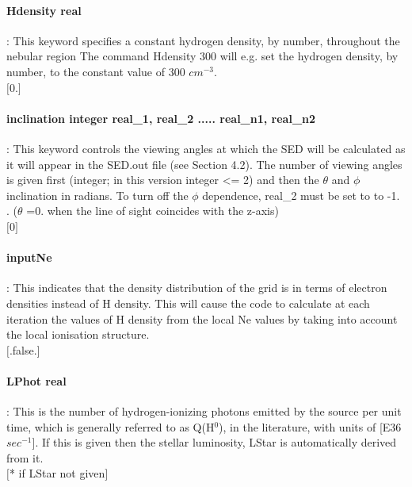 \documentclass[11pt]{article}
\begin{document}
\paragraph    {Hdensity real }   : This keyword specifies a constant hydrogen density, 
		     by number, throughout the nebular region 
		     The command Hdensity 300 will e.g. set the 
		     hydrogen density, by number, to the constant value of 300 $cm^{-3}$.\\
		     $[$0.$]$\\

\paragraph    {inclination integer real\_1, real\_2 ..... real\_{n1}, real\_{n2}} : This keyword controls the
                     viewing angles at which the SED will be calculated as it will appear 
		     in the SED.out file (see Section 4.2). The number of viewing 
		     angles is given first (integer; in this version integer <= 2) and then the $\theta$
                     and $\phi$ inclination in radians. To turn off the $\phi$ dependence, real\_2 must be set to 
		     to -1. . 
		     ($\theta$ =0. when the line of sight coincides with the z-axis)\\
		     $[$0$]$\\

\paragraph    {inputNe  }        : This indicates that the density distribution of the grid is in 
                     terms of electron densities instead of H density. This will cause 
                     the code to calculate at each iteration the values of H density 
                     from the local Ne values by taking into account the local 
		     ionisation structure. \\
		     $[$.false.$]$\\

\paragraph    {LPhot real	  }   : This is the number of hydrogen-ionizing photons emitted by 
		     the source per unit time, which is generally referred to as 
		     Q(H$^0$), in the literature, with units of [E36 $sec^{-1}$]. If this 
		     is given then the stellar luminosity, LStar is automatically 
		     derived from it.\\
		     $[$* if LStar not given$]$\\
\end{document}
